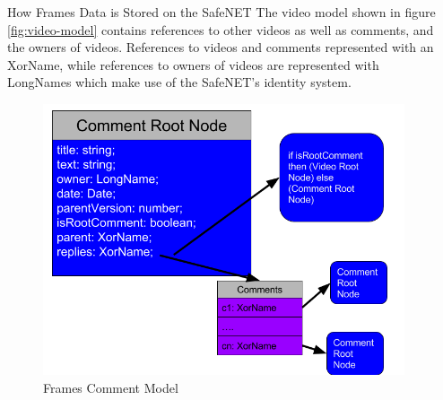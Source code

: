 \documentclass[final]{beamer}
\newlength{\onecolwid}
\newlength{\twocolwid}
\begin{document}
\begin{frame}[t]
\begin{columns}[t]
\begin{column}{\twocolwid}
\begin{columns}[t,totalwidth=\twocolwid]
\begin{column}{\onecolwid}
\begin{block}{How Frames Data is Stored on the SafeNET}
  The video model shown in figure \ref{fig:video-model} contains references to
  other videos as well as comments, and the owners of videos. References to videos and comments
  represented with an XorName, while references to owners of videos are
  represented with LongNames which make use of the SafeNET's identity system.

  \begin{figure}
  \includegraphics[width=0.8\linewidth]{comment-model.png}
  \caption{Frames Comment Model}
  \label{fig:comment-model}
  \end{figure}

\end{block}


\end{column} %

\begin{column}{\onecolwid}\vspace{-.6in} %


\begin{block}{}


\end{block}
\end{column}
\end{columns}
\end{column}
\end{columns}
\end{frame}
\end{document}
